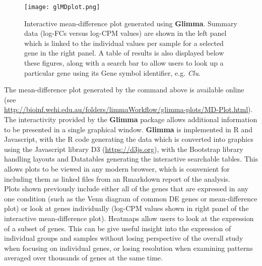 \documentclass[10pt,a4paper]{extarticle}\usepackage[]{graphicx}\usepackage[]{color}
\begin{document}
\begin{figure}
\centering
\texttt{[image: glMDplot.png]}
\caption{\label{fig:GlimmaMD}Interactive mean-difference plot generated using \textbf{Glimma}. Summary data (log-FCs versus log-CPM values) are shown in the left panel which is linked to the individual values per sample for a selected gene in the right panel. A table of results is also displayed below these figures, along with a search bar to allow users to look up a particular gene using its Gene symbol identifier, e.g. \textit{Clu}.}
\end{figure}

The mean-difference plot generated by the command above is available online (see \\ \url{http://bioinf.wehi.edu.au/folders/limmaWorkflow/glimma-plots/MD-Plot.html}). 
The interactivity provided by the \textbf{Glimma} package allows additional information to be presented in a single graphical window. 
\textbf{Glimma} is implemented in \textsf{R} and Javascript, with the \textsf{R} code generating the data which is converted into graphics using the Javascript library D3 (\url{https://d3js.org}), with the Bootstrap library handling layouts and Datatables generating the interactive searchable tables. 
This allows plots to be viewed in any modern browser, which is convenient for including them as linked files from an Rmarkdown report of the analysis.\\

Plots shown previously include either all of the genes that are expressed in any one condition (such as the Venn diagram of common DE genes or mean-difference plot) or look at genes individually (log-CPM values shown in right panel of the interactive mean-difference plot). Heatmaps allow users to look at the expression of a subset of genes. This can be give useful insight into the expression of individual groups and samples without losing perspective of the overall study when focusing on individual genes, or losing resolution when examining patterns averaged over thousands of genes at the same time.\\
\end{document}
